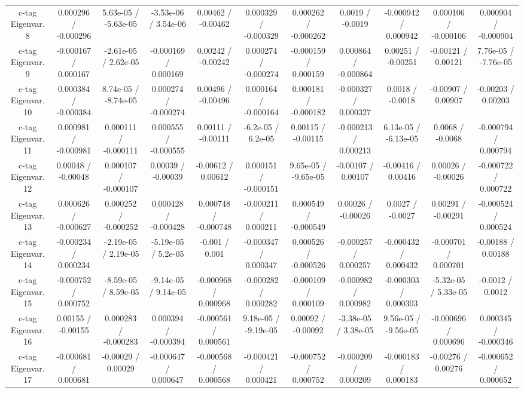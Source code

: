 \begin{table}[htbp]
\begin{center}
\begin{tabular}{|c|c|c|c|c|c|c|c|c|c|c|}
  c-tag Eigenvar. 8 & 0.000296 / -0.000296 & 5.63e-05 / -5.63e-05 & -3.53e-06 / 3.54e-06 & 0.00462 / -0.00462 & 0.000329 / -0.000329 & 0.000262 / -0.000262 & 0.0019 / -0.0019 & -0.000942 / 0.000942 & 0.000106 / -0.000106 & 0.000904 / -0.000904 \\ 
  c-tag Eigenvar. 9 & -0.000167 / 0.000167 & -2.61e-05 / 2.62e-05 & -0.000169 / 0.000169 & 0.00242 / -0.00242 & 0.000274 / -0.000274 & -0.000159 / 0.000159 & 0.000864 / -0.000864 & 0.00251 / -0.00251 & -0.00121 / 0.00121 & 7.76e-05 / -7.76e-05 \\ 
  c-tag Eigenvar. 10 & 0.000384 / -0.000384 & 8.74e-05 / -8.74e-05 & 0.000274 / -0.000274 & 0.00496 / -0.00496 & 0.000164 / -0.000164 & 0.000181 / -0.000182 & -0.000327 / 0.000327 & 0.0018 / -0.0018 & -0.00907 / 0.00907 & -0.00203 / 0.00203 \\ 
  c-tag Eigenvar. 11 & 0.000981 / -0.000981 & 0.000111 / -0.000111 & 0.000555 / -0.000555 & 0.00111 / -0.00111 & -6.2e-05 / 6.2e-05 & 0.00115 / -0.00115 & -0.000213 / 0.000213 & 6.13e-05 / -6.13e-05 & 0.0068 / -0.0068 & -0.000794 / 0.000794 \\ 
  c-tag Eigenvar. 12 & 0.00048 / -0.00048 & 0.000107 / -0.000107 & 0.00039 / -0.00039 & -0.00612 / 0.00612 & 0.000151 / -0.000151 & 9.65e-05 / -9.65e-05 & -0.00107 / 0.00107 & -0.00416 / 0.00416 & 0.00026 / -0.00026 & -0.000722 / 0.000722 \\ 
  c-tag Eigenvar. 13 & 0.000626 / -0.000627 & 0.000252 / -0.000252 & 0.000428 / -0.000428 & 0.000748 / -0.000748 & -0.000211 / 0.000211 & 0.000549 / -0.000549 & 0.00026 / -0.00026 & 0.0027 / -0.0027 & 0.00291 / -0.00291 & -0.000524 / 0.000524 \\ 
  c-tag Eigenvar. 14 & -0.000234 / 0.000234 & -2.19e-05 / 2.19e-05 & -5.19e-05 / 5.2e-05 & -0.001 / 0.001 & -0.000347 / 0.000347 & 0.000526 / -0.000526 & -0.000257 / 0.000257 & -0.000432 / 0.000432 & -0.000701 / 0.000701 & -0.00188 / 0.00188 \\ 
  c-tag Eigenvar. 15 & -0.000752 / 0.000752 & -8.59e-05 / 8.59e-05 & -9.14e-05 / 9.14e-05 & -0.000968 / 0.000968 & -0.000282 / 0.000282 & -0.000109 / 0.000109 & -0.000982 / 0.000982 & -0.000303 / 0.000303 & -5.32e-05 / 5.33e-05 & -0.0012 / 0.0012 \\ 
  c-tag Eigenvar. 16 & 0.00155 / -0.00155 & 0.000283 / -0.000283 & 0.000394 / -0.000394 & -0.000561 / 0.000561 & 9.18e-05 / -9.19e-05 & 0.00092 / -0.00092 & -3.38e-05 / 3.38e-05 & 9.56e-05 / -9.56e-05 & -0.000696 / 0.000696 & 0.000345 / -0.000346 \\ 
  c-tag Eigenvar. 17 & -0.000681 / 0.000681 & -0.00029 / 0.00029 & -0.000647 / 0.000647 & -0.000568 / 0.000568 & -0.000421 / 0.000421 & -0.000752 / 0.000752 & -0.000209 / 0.000209 & -0.000183 / 0.000183 & -0.00276 / 0.00276 & -0.000652 / 0.000652 \\ 

\end{tabular}
\end{center}
\end{table}
